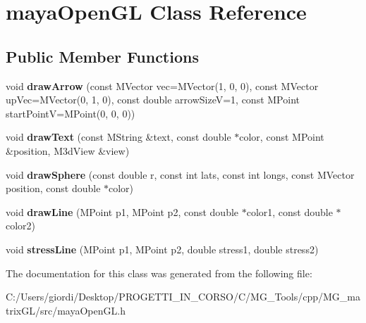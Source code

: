 \hypertarget{classmaya_open_g_l}{\section{maya\-Open\-G\-L Class Reference}
\label{classmaya_open_g_l}
}
\subsection*{Public Member Functions}
\begin{DoxyCompactItemize}
\item 
\hypertarget{classmaya_open_g_l_af377271a6daddb1dc240d66c19d531f7}{void {\bfseries draw\-Arrow} (const M\-Vector vec=M\-Vector(1, 0, 0), const M\-Vector up\-Vec=M\-Vector(0, 1, 0), const double arrow\-Size\-V=1, const M\-Point start\-Point\-V=M\-Point(0, 0, 0))}\label{classmaya_open_g_l_af377271a6daddb1dc240d66c19d531f7}

\item 
\hypertarget{classmaya_open_g_l_a8c5a5c0de809f5d339eddbf84f577e5f}{void {\bfseries draw\-Text} (const M\-String \&text, const double $\ast$color, const M\-Point \&position, M3d\-View \&view)}\label{classmaya_open_g_l_a8c5a5c0de809f5d339eddbf84f577e5f}

\item 
\hypertarget{classmaya_open_g_l_aee6b2f7d73d41f244f99570fe200af4a}{void {\bfseries draw\-Sphere} (const double r, const int lats, const int longs, const M\-Vector position, const double $\ast$color)}\label{classmaya_open_g_l_aee6b2f7d73d41f244f99570fe200af4a}

\item 
\hypertarget{classmaya_open_g_l_a8be12e3bfb78bffe716bd960f66a69f0}{void {\bfseries draw\-Line} (M\-Point p1, M\-Point p2, const double $\ast$color1, const double $\ast$color2)}\label{classmaya_open_g_l_a8be12e3bfb78bffe716bd960f66a69f0}

\item 
\hypertarget{classmaya_open_g_l_aecbad073c07b75ef9d02f5e9dc607a57}{void {\bfseries stress\-Line} (M\-Point p1, M\-Point p2, double stress1, double stress2)}\label{classmaya_open_g_l_aecbad073c07b75ef9d02f5e9dc607a57}

\end{DoxyCompactItemize}


The documentation for this class was generated from the following file\-:\begin{DoxyCompactItemize}
\item 
C\-:/\-Users/giordi/\-Desktop/\-P\-R\-O\-G\-E\-T\-T\-I\-\_\-\-I\-N\-\_\-\-C\-O\-R\-S\-O/\-C/\-M\-G\-\_\-\-Tools/cpp/\-M\-G\-\_\-matrix\-G\-L/src/maya\-Open\-G\-L.\-h\end{DoxyCompactItemize}

